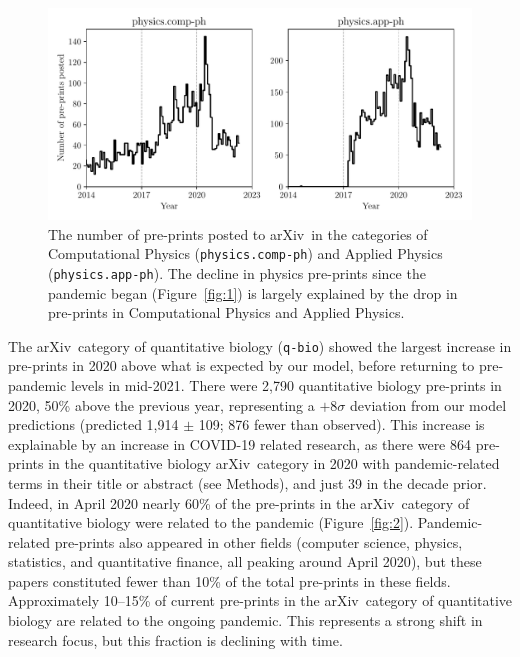 \documentclass[]{rsos}%
\newcommand{\arxiv}{arXiv}
\newcommand{\change}[1]{#1}
\begin{document}
\begin{figure}[!t]
\includegraphics[width=0.95\linewidth]{physics-pre-prints}
\caption{The number of pre-prints posted to \arxiv\ in the categories of Computational Physics (\texttt{physics.comp-ph}) and Applied Physics (\texttt{physics.app-ph}). The decline in physics pre-prints since the pandemic began (Figure~\ref{fig:1}) is largely explained by the drop in pre-prints in Computational Physics and Applied Physics.}
\label{fig:physics}
\end{figure}



The \change{\arxiv\ category} of quantitative biology (\texttt{q-bio}) showed the largest increase in pre-prints in 2020 above what is expected by our model, before returning to pre-pandemic levels in mid-2021. %
There were {2,790} quantitative biology pre-prints in 2020, {50\%} above the previous year, representing a $+8\sigma$ deviation from our model predictions (predicted 1,914 $\pm$ 109; 876 fewer than observed). This increase is explainable by an increase in COVID-19 related research, as there were 864 \change{pre-prints in the quantitative biology \arxiv\ category} in 2020 with pandemic-related terms in their title or abstract (see Methods), and just 39 in the decade prior. Indeed, in {April 2020} nearly 60\% of the \change{pre-prints in the \arxiv\ category of quantitative biology} were related to the pandemic (Figure~\ref{fig:2}). Pandemic-related pre-prints also appeared in other fields (computer science, physics, statistics, and quantitative finance, all peaking around {April 2020}), but these papers constituted fewer than 10\% of the total pre-prints in these fields. Approximately 10--15\% of current pre-prints in \change{the \arxiv\ category of} quantitative biology are related to the ongoing pandemic. This represents a strong shift in research focus, but this fraction is declining with time. %
\end{document}
